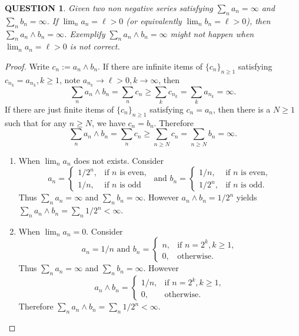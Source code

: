 \documentclass[12pt]{article}
\renewcommand{\(}{\left(}%
\renewcommand{\)}{\right)}%
\renewcommand{\[}{\left[}%
\renewcommand{\]}{\right]}%
\newtheorem{question}{QUESTION}[section]}
\newtheorem{proof}{Proof.}}
\begin{document}
  \begin{question}
  	Given two non negative series satisfying $\sum_n a_n=\infty$ and $\sum_nb_n=\infty$. If $\lim_n a_n=\ell> 0$ (or equivalently $\lim_n b_n=\ell> 0$), then $\sum_na_n\wedge b_n=\infty$. Exemplify $\sum_na_n\wedge b_n=\infty$ might not happen when $\lim_n a_n=\ell>0$ is not correct. 
  \end{question}
  \begin{proof}
  	Write $c_n:=a_n\wedge b_n$. If there are infinite items of $\{c_{n}\}_{n\geq 1}$ satisfying $c_{n_k}=a_{n_k},k\geq 1$, note $a_{n_k}\to\ell>0,k\to\infty$, then 
  	\begin{equation*}
  		\sum_n a_n\wedge b_n =\sum_nc_n\geq \sum_kc_{n_k}=\sum_k a_{n_k}=\infty.
  	\end{equation*} 
  	If there are just finite items of $\{c_{n}\}_{n\geq 1}$ satisfying $c_n=a_n$, then there is a $N\geq 1$ such that for any $n\geq N$, we have $c_n=b_n$. Therefore
  	\begin{equation*}
  		\sum_n a_n\wedge b_n =\sum_nc_n\geq \sum_{n\geq N}c_{n}=\sum_{n\geq N}b_{n}=\infty.
  	\end{equation*}
  	\begin{enumerate}
  		\item When $\lim_na_n$ does not exists. Consider 
  	\begin{equation*}
  		a_n=
  		\begin{cases}
  			1/2^n,&\mbox{if $n$ is even},\\
  			1/n,&\mbox{if $n$ is odd}
  		\end{cases}
  		\text{ and }
  		b_n=
  		\begin{cases}
  			1/n,&\mbox{if $n$ is even},\\
  			1/2^n,&\mbox{if $n$ is odd}.
  		\end{cases}
  	\end{equation*}
  	Thus $\sum_na_n=\infty$ and $\sum_n b_n=\infty$. However $a_n\wedge b_n=1/2^n$ yields $\sum_na_n\wedge b_n=\sum_n1/2^n<\infty$.
  		\item When $\lim_na_n=0$. Consider
  		\begin{equation*}
  		a_n=1/n
  		\text{ and }
  		b_n=
  		\begin{cases}
  			n,&\mbox{if $n=2^k,k\geq 1$},\\
  			0,&\mbox{otherwise}.
  		\end{cases}
  	\end{equation*}
  	Thus $\sum_na_n=\infty$ and $\sum_n b_n=\infty$. However
  	\begin{equation*}
  		a_n\wedge b_n=
  		\begin{cases}
  			1/n,&\mbox{if $n=2^k,k\geq 1$},\\
  			0,&\mbox{otherwise}.
  		\end{cases}
  	\end{equation*}
  	 Therefore $\sum_na_n\wedge b_n=\sum_n1/2^n<\infty$.
  	\end{enumerate}
  \end{proof}
  
\end{document}
